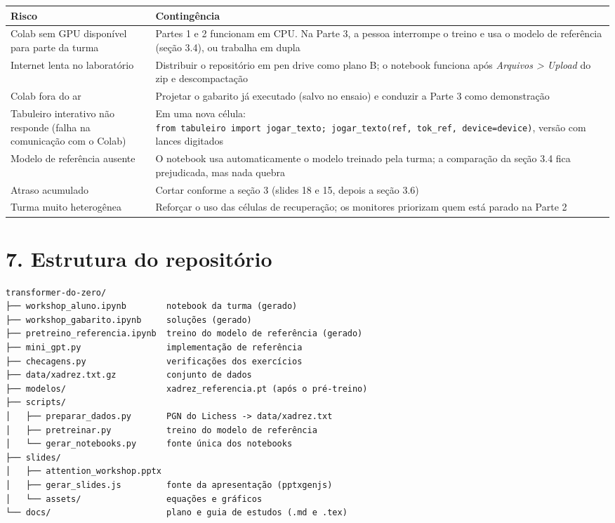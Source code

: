 \documentclass[
  11pt,
]{article}
\begin{document}
\begin{longtable}[]{@{}
  >{\raggedright\arraybackslash}p{}
  >{\raggedright\arraybackslash}p{}@{}}
\toprule\noalign{}
\begin{minipage}[b]{\linewidth}\raggedright
Risco
\end{minipage} & \begin{minipage}[b]{\linewidth}\raggedright
Contingência
\end{minipage} \\
\midrule\noalign{}
\endhead
\bottomrule\noalign{}
\endlastfoot
Colab sem GPU disponível para parte da turma & Partes 1 e 2 funcionam em
CPU. Na Parte 3, a pessoa interrompe o treino e usa o modelo de
referência (seção 3.4), ou trabalha em dupla \\
Internet lenta no laboratório & Distribuir o repositório em pen drive
como plano B; o notebook funciona após \emph{Arquivos \textgreater{}
Upload} do zip e descompactação \\
Colab fora do ar & Projetar o gabarito já executado (salvo no ensaio) e
conduzir a Parte 3 como demonstração \\
Tabuleiro interativo não responde (falha na comunicação com o Colab) &
Em uma nova célula:
\texttt{from\ tabuleiro\ import\ jogar\_texto;\ jogar\_texto(ref,\ tok\_ref,\ device=device)},
versão com lances digitados \\
Modelo de referência ausente & O notebook usa automaticamente o modelo
treinado pela turma; a comparação da seção 3.4 fica prejudicada, mas
nada quebra \\
Atraso acumulado & Cortar conforme a seção 3 (slides 18 e 15, depois a
seção 3.6) \\
Turma muito heterogênea & Reforçar o uso das células de recuperação; os
monitores priorizam quem está parado na Parte 2 \\
\end{longtable}

\section{7. Estrutura do repositório}\label{estrutura-do-reposituxf3rio}

\begin{verbatim}
transformer-do-zero/
├── workshop_aluno.ipynb        notebook da turma (gerado)
├── workshop_gabarito.ipynb     soluções (gerado)
├── pretreino_referencia.ipynb  treino do modelo de referência (gerado)
├── mini_gpt.py                 implementação de referência
├── checagens.py                verificações dos exercícios
├── data/xadrez.txt.gz          conjunto de dados
├── modelos/                    xadrez_referencia.pt (após o pré-treino)
├── scripts/
│   ├── preparar_dados.py       PGN do Lichess -> data/xadrez.txt
│   ├── pretreinar.py           treino do modelo de referência
│   └── gerar_notebooks.py      fonte única dos notebooks
├── slides/
│   ├── attention_workshop.pptx
│   ├── gerar_slides.js         fonte da apresentação (pptxgenjs)
│   └── assets/                 equações e gráficos
└── docs/                       plano e guia de estudos (.md e .tex)
\end{verbatim}
\end{document}

